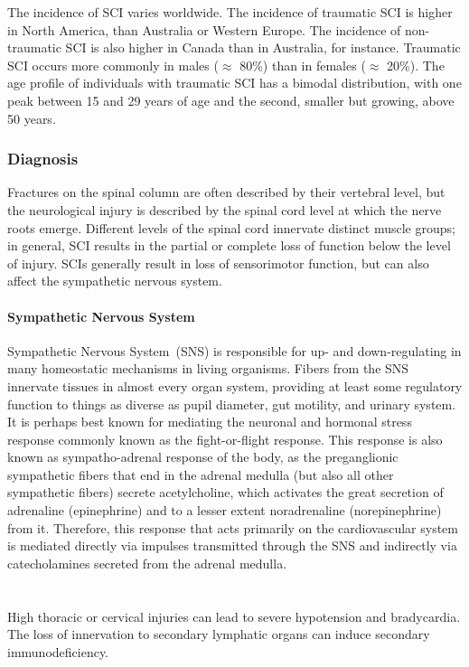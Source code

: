 \documentclass[12pt,article,oneside,a4paper]{memoir}
\begin{document}
The incidence of SCI varies worldwide. The incidence of traumatic SCI is higher
in North America, than Australia or Western Europe. The incidence of
non-traumatic SCI is also higher in Canada than in Australia, for instance.
Traumatic SCI occurs more commonly in males ($\approx$ 80\%) than in females
($\approx$ 20\%). The age profile of individuals with traumatic SCI has a
bimodal distribution, with one peak between 15 and 29 years of age and the
second, smaller but growing, above 50 years.

\subsubsection{Diagnosis}
Fractures on the spinal column are often described by their vertebral level,
but the neurological injury is described by the spinal cord level at which the
nerve roots emerge. Different levels of the spinal cord innervate distinct
muscle groups; in general, SCI results in the partial or complete loss of
function below the level of injury. SCIs generally result in loss of
sensorimotor function, but can also affect the sympathetic nervous system.

\paragraph{Sympathetic Nervous System}
Sympathetic Nervous System~(SNS) is responsible for up- and down-regulating in
many homeostatic mechanisms in living organisms. Fibers from the SNS innervate
tissues in almost every organ system, providing at least some regulatory
function to things as diverse as pupil diameter, gut motility, and urinary
system. It is perhaps best known for mediating the neuronal and hormonal stress
response commonly known as the fight-or-flight response. This response is also
known as sympatho-adrenal response of the body, as the preganglionic
sympathetic fibers that end in the adrenal medulla (but also all other
sympathetic fibers) secrete acetylcholine, which activates the great secretion
of adrenaline (epinephrine) and to a lesser extent noradrenaline
(norepinephrine) from it. Therefore, this response that acts primarily on the
cardiovascular system is mediated directly via impulses transmitted through the
SNS and indirectly via catecholamines secreted from the adrenal medulla.
\\
\\
\\
High thoracic or cervical injuries can lead to severe hypotension and
bradycardia. The loss of innervation to secondary lymphatic organs can induce
secondary immunodeficiency.
\end{document}
